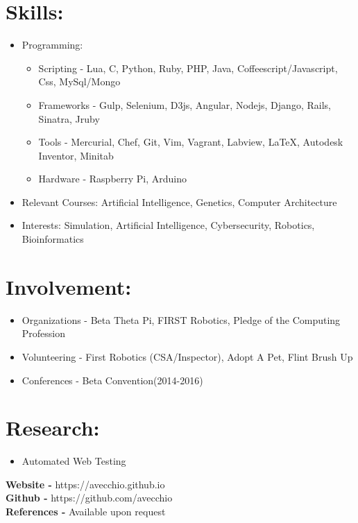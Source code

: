 \documentclass{res}
\begin{document}
\section{Skills:}
\begin{itemize}[leftmargin=*]
\item Programming:
\begin{itemize}[label=$\circ$]
\item Scripting - Lua, C, Python, Ruby, PHP, Java, Coffeescript/Javascript, Css, MySql/Mongo
\item Frameworks - Gulp, Selenium, D3js, Angular, Nodejs, Django, Rails, Sinatra, Jruby
\item Tools - Mercurial, Chef, Git, Vim, Vagrant, Labview, \LaTeX, Autodesk Inventor, Minitab
\item Hardware - Raspberry Pi, Arduino
\end{itemize}
\item Relevant Courses: Artificial Intelligence, Genetics, Computer Architecture
\item Interests: Simulation, Artificial Intelligence, Cybersecurity, Robotics, Bioinformatics
\end{itemize}

\section{Involvement:}
\begin{itemize}[leftmargin=*]
\item Organizations - Beta Theta Pi, FIRST Robotics, Pledge of the Computing Profession
\item Volunteering - First Robotics (CSA/Inspector), Adopt A Pet, Flint Brush Up
\item Conferences - Beta Convention(2014-2016)%
\end{itemize}

\section{Research:}
\begin{itemize}[leftmargin=*]
\item Automated Web Testing
\end{itemize}

\begin{center}
\textbf{Website - }https://avecchio.github.io\\
\textbf{Github - }https://github.com/avecchio\\
\textbf{References - }Available upon request
\end{center}
\end{document}

